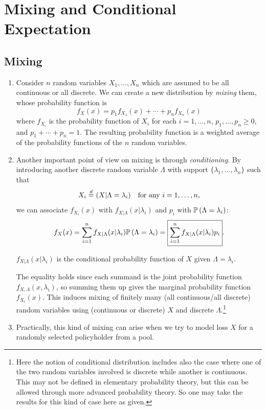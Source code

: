 \section{Mixing and Conditional Expectation}
\label{sect:mixing-and-ce}
\subsection{Mixing}
\begin{enumerate}
\item Consider \(n\) random variables \(X_1,\dotsc,X_n\) which are assumed to
be all continuous or all discrete. We can create a new distribution by
\emph{mixing} them, whose probability function is
\[
f_X(x)=p_1f_{X_1}(x)+\dotsb+p_nf_{X_n}(x)
\]
where \(f_{X_i}\) is the probability function of \(X_i\) for each
\(i=1,\dotsc,n\), \(p_1,\dotsc,p_n\ge 0\), and \(p_1+\dotsb+p_n=1\). The
resulting probability function is a weighted average of the probability
functions of the \(n\) random variables.
\item \label{it:mixing-finite}
Another important point of view on mixing is through \emph{conditioning}.  By
introducing another discrete random variable \(\Lambda\) with support
\(\{\lambda_1,\dotsc,\lambda_n\}\) such that
\[
X_i\overset{d}= (X|\Lambda=\lambda_i)\quad\text{for any \(i=1,\dotsc,n\)},
\]
we can associate \(f_{X_i}(x)\) with \(f_{X|\Lambda}(x|\lambda_i)\) and \(p_i\)
with \(\mathbb{P}\left(\Lambda=\lambda_i\right)\):
\[
f_X(x)=\sum_{i=1}^{n}f_{X|\Lambda}(x|\lambda_i)\mathbb{P}\left(\Lambda=\lambda_i\right)
=\boxed{\sum_{i=1}^{n}f_{X|\Lambda}(x|\lambda_i)p_i}.
\]
\begin{note}
\(f_{X|\Lambda}(x|\lambda_i)\) is the conditional probability function of \(X\)
given \(\Lambda=\lambda_i\).
\end{note}

The equality holds since each summand is the joint probability function
\(f_{X,\Lambda}(x,\lambda_i)\), so summing them up gives the marginal
probability function \(f_{X_i}(x)\). This induces mixing of finitely many (all
continuous/all discrete) random variables using (continuous or discrete) \(X\)
and discrete \(\Lambda\).\footnote{Here the notion of conditional distribution
includes also the case where one of the two random variables involved is
discrete while another is continuous. This may not be defined in elementary
probability theory, but this can be allowed through more advanced probability
theory. So one may take the results for this kind of case here as given.}

\item Practically, this kind of mixing can arise when we try to model loss
\(X\)  for a randomly selected policyholder  from
a pool.


\end{enumerate}

